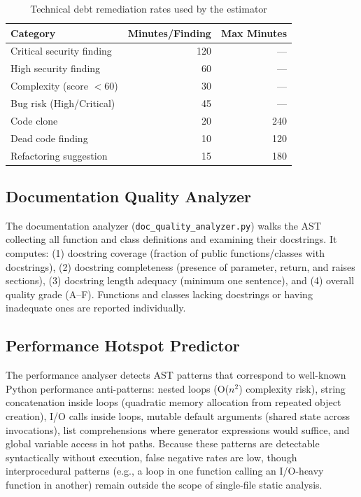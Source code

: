 \documentclass[12pt, oneside]{report}
\begin{document}
\begin{table}[H]
\centering
\caption{Technical debt remediation rates used by the estimator}
\label{tab:debtrates}
\begin{tabular}{@{}lrr@{}}
\toprule
\textbf{Category} & \textbf{Minutes/Finding} & \textbf{Max Minutes} \\
\midrule
Critical security finding & 120 & --- \\
High security finding     &  60 & --- \\
Complexity (score $< 60$) &  30 & --- \\
Bug risk (High/Critical)  &  45 & --- \\
Code clone                &  20 & 240 \\
Dead code finding         &  10 & 120 \\
Refactoring suggestion    &  15 & 180 \\
\bottomrule
\end{tabular}
\end{table}

\subsection{Documentation Quality Analyzer}
\label{ssec:docs}

The documentation analyzer (\texttt{doc\_quality\_analyzer.py}) walks the AST collecting
all function and class definitions and examining their docstrings. It computes:
(1) docstring coverage (fraction of public functions/classes with docstrings),
(2) docstring completeness (presence of parameter, return, and raises sections),
(3) docstring length adequacy (minimum one sentence), and (4) overall quality grade (A--F).
Functions and classes lacking docstrings or having inadequate ones are reported individually.

\subsection{Performance Hotspot Predictor}
\label{ssec:performance}

The performance analyser detects AST patterns that correspond to well-known Python
performance anti-patterns: nested loops (O($n^2$) complexity risk), string
concatenation inside loops (quadratic memory allocation from repeated object
creation), I/O calls inside loops, mutable default arguments (shared state across
invocations), list comprehensions where generator expressions would suffice, and
global variable access in hot paths. Because these patterns are detectable
syntactically without execution, false negative rates are low, though interprocedural
patterns (e.g., a loop in one function calling an I/O-heavy function in another)
remain outside the scope of single-file static analysis.
\end{document}
